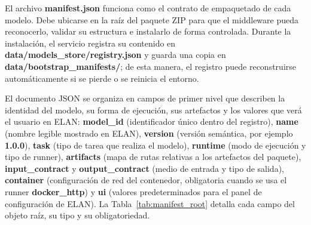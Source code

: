 \documentclass[11pt,a4paper]{article}
\begin{document}
\renewcommand{\thetable}{I.\arabic{table}}
\renewcommand{\theHtable}{anexoI.table.\arabic{table}}
\setcounter{table}{0}
\renewcommand{\thecodigo}{I.\arabic{codigo}}
\renewcommand{\theHcodigo}{anexoI.codigo.\arabic{codigo}}
\setcounter{codigo}{0}
\renewcommand{\thecomando}{I.\arabic{comando}}
\renewcommand{\theHcomando}{anexoI.comando.\arabic{comando}}
\setcounter{comando}{0}
\renewcommand{\thefigure}{I.\arabic{figure}}
\renewcommand{\theHfigure}{anexoI.figure.\arabic{figure}}
\setcounter{figure}{0}

El archivo \textbf{manifest.json} funciona como el contrato de empaquetado de cada modelo. Debe ubicarse en la raíz del paquete ZIP para que el middleware pueda reconocerlo, validar su estructura e instalarlo de forma controlada. Durante la instalación, el servicio registra su contenido en \textbf{data/models\_store/registry.json} y guarda una copia en \textbf{data/bootstrap\_manifests/}; de esta manera, el registro puede reconstruirse automáticamente si se pierde o se reinicia el entorno.

El documento JSON se organiza en campos de primer nivel que describen la identidad del modelo, su forma de ejecución, sus artefactos y los valores que verá el usuario en ELAN: \textbf{model\_id} (identificador único dentro del registro), \textbf{name} (nombre legible mostrado en ELAN), \textbf{version} (versión semántica, por ejemplo \textbf{1.0.0}), \textbf{task} (tipo de tarea que realiza el modelo), \textbf{runtime} (modo de ejecución y tipo de runner), \textbf{artifacts} (mapa de rutas relativas a los artefactos del paquete), \textbf{input\_contract} y \textbf{output\_contract} (medio de entrada y tipo de salida), \textbf{container} (configuración de red del contenedor, obligatoria cuando se usa el runner \textbf{docker\_http}) y \textbf{ui} (valores predeterminados para el panel de configuración de ELAN). La Tabla~\ref{tab:manifest_root} detalla cada campo del objeto raíz, su tipo y su obligatoriedad.
\end{document}
